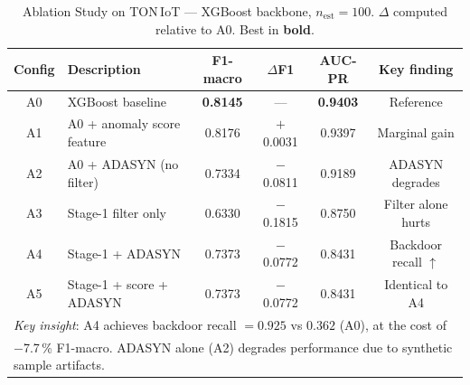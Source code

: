 \begin{table}[!t]
\renewcommand{\arraystretch}{1.2}
\caption{Ablation Study on TON\,IoT — XGBoost backbone, $n_\text{est}=100$.
$\Delta$ computed relative to A0. Best in \textbf{bold}.}
\label{tab:ablation}
\centering
\footnotesize
\begin{tabular}{clcccc}
\toprule
\textbf{Config} & \textbf{Description} & \textbf{F1-macro} & \textbf{$\Delta$F1} &
\textbf{AUC-PR} & \textbf{Key finding} \\
\midrule
A0 & XGBoost baseline             & \textbf{0.8145} & ---      & \textbf{0.9403} & Reference \\
A1 & A0 + anomaly score feature   & 0.8176 & $+$0.0031 & 0.9397 & Marginal gain \\
A2 & A0 + ADASYN (no filter)      & 0.7334 & $-$0.0811 & 0.9189 & ADASYN degrades \\
A3 & Stage-1 filter only          & 0.6330 & $-$0.1815 & 0.8750 & Filter alone hurts \\
A4 & Stage-1 + ADASYN             & 0.7373 & $-$0.0772 & 0.8431 & Backdoor recall $\uparrow$ \\
A5 & Stage-1 + score + ADASYN     & 0.7373 & $-$0.0772 & 0.8431 & Identical to A4 \\
\midrule
\multicolumn{6}{l}{\textit{Key insight}: A4 achieves backdoor recall $= 0.925$ vs $0.362$ (A0), at the cost of} \\
\multicolumn{6}{l}{$-$7.7\,\% F1-macro. ADASYN alone (A2) degrades performance due to synthetic sample artifacts.} \\
\bottomrule
\end{tabular}
\end{table}

